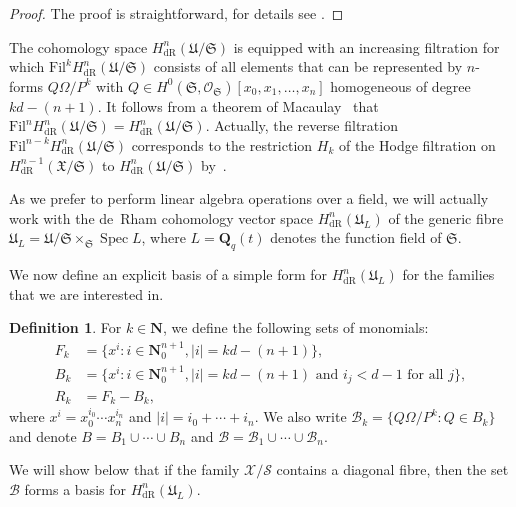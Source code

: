 \documentclass[a4paper,11pt]{article}
\numberwithin{equation}{section}
\providecommand{\abs}[1]{\lvert#1\rvert}                 %
\newcommand{\NN}{\mathbf{N}} %
\newcommand{\QQ}{\mathbf{Q}} %
\DeclareMathOperator{\Spec}{Spec}        %
\providecommand{\HdR}{H_{\text{dR}}}    %
\providecommand{\cB}{\mathcal{B}} %
\theoremstyle{definition}
\newtheorem{defn}[thm]{Definition}
\begin{document}
\begin{proof}
The proof is straightforward, for details see \cite{Griffiths1969}.
\end{proof}

The cohomology space $\HdR^{n}(\mathfrak{U}/\mathfrak{S})$ is 
equipped with an increasing filtration for which 
$\mbox{Fil}^k \HdR^{n}(\mathfrak{U}/\mathfrak{S})$ consists of all elements 
that can be represented by $n$-forms $Q \Omega / P^k$ with 
$Q \in H^0(\mathfrak{S},\mathcal{O}_{\mathfrak{S}})[x_0, x_1, \dotsc, x_n]$ 
homogeneous of degree $kd - (n + 1)$.  It follows from a theorem of 
Macaulay~\citep[\S 4, (4.11)]{Griffiths1969} that 
$\mbox{Fil}^n \HdR^{n}(\mathfrak{U}/\mathfrak{S}) = \HdR^{n}(\mathfrak{U}/\mathfrak{S})$. 
Actually, the reverse filtration $\mbox{Fil}^{n-k} \HdR^{n}(\mathfrak{U}/\mathfrak{S})$
corresponds to the restriction $H_k$ of the Hodge filtration on 
$\HdR^{n-1}(\mathfrak{X}/\mathfrak{S})$ to $\HdR^{n}(\mathfrak{U}/\mathfrak{S})$ 
by~\cite{Griffiths1969}.

As we prefer to perform linear 
algebra operations over a field, we will actually work with the de~Rham 
cohomology vector space $\HdR^{n}(\mathfrak{U}_L)$ of the generic fibre 
$\mathfrak{U}_L = \mathfrak{U}/\mathfrak{S} \times_{\mathfrak{S}} \Spec{L}$, 
where $L=\QQ_q(t)$ denotes the function field of $\mathfrak{S}$. 

We now define an explicit basis of a simple form for $\HdR^{n}(\mathfrak{U}_L)$ 
for the families that we are interested in.

\begin{defn} \label{defn:MonBasis}
For $k \in \NN$, we define the following sets of monomials: 
\begin{align*}
F_k & = \{ x^i : i \in \mathbf{N}_{0}^{n+1}, \abs{i} = k d - (n+1) \}, \\
B_k & = \{ x^i : i \in \mathbf{N}_{0}^{n+1}, \abs{i} = k d - (n+1) \text{ and $i_j < d-1$ for all $j$}\}, \\
R_k & = F_k - B_k,
\end{align*}
where $x^i = x_0^{i_0} \dotsm x_n^{i_n}$ and $\abs{i} = i_0 + \dotsb + i_n$. 
We also write $\cB_k = \{Q \Omega / P^k : Q \in B_k\}$ and denote
$B = B_1 \cup \dotsb \cup B_n$ and $\cB = \cB_1 \cup \dotsb \cup \cB_n$.
\end{defn}

We will show below that if the family $\mathcal{X}/{\mathcal{S}}$ contains 
a diagonal fibre, then the set $\cB$ forms a basis for $\HdR^n(\mathfrak{U}_L)$.
\end{document}
